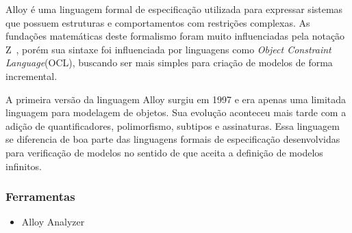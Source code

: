 Alloy é uma linguagem formal de especificação utilizada para expressar sistemas que possuem
estruturas e comportamentos com restrições complexas. As fundações matemáticas deste formalismo
foram muito influenciadas pela notação Z~\cite{opac-b1091336}, porém sua sintaxe foi influenciada
por linguagens como \textit{Object Constraint Language}(OCL), buscando ser mais simples para
criação de modelos de forma incremental.

A primeira versão da linguagem Alloy surgiu em 1997 e era apenas uma limitada linguagem para modelagem
de objetos. Sua evolução aconteceu mais tarde com a adição de quantificadores, polimorfismo, subtipos e
assinaturas. Essa linguagem se diferencia de boa parte das linguagens formais de especificação desenvolvidas
para verificação de modelos no sentido de que aceita a definição de modelos infinitos.

\subsubsection{Ferramentas}
\begin{itemize}
\item{Alloy Analyzer}
\end{itemize}

